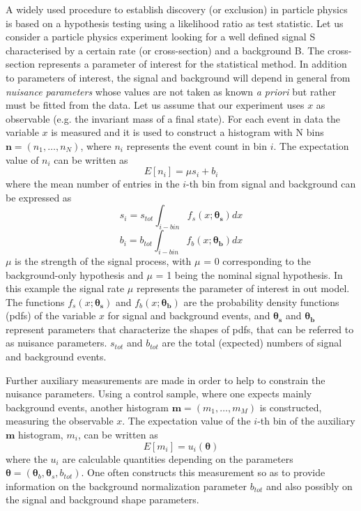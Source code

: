 \documentclass[a4paper, oneside, 11pt, openright]{book}
\begin{document}
 			A widely used procedure to establish discovery (or exclusion) in particle physics is based on a hypothesis testing using a likelihood ratio as test statistic. Let us consider a particle physics experiment looking for a well defined signal S characterised by a certain rate (or cross-section) and a background B. The cross-section represents a parameter of interest for the statistical method. In addition to parameters of interest, the signal and background will depend in general from \textit{nuisance parameters} whose values are not taken as known \textit{a priori} but rather must be fitted from the data. Let us assume that our experiment uses $x$ as observable (e.g. the invariant mass of a final state). For each event in data the variable $x$ is measured and it is used to construct a histogram with N bins $\textbf{n} = (n_1,\dots, n_N)$, where $n_i$ represents the event count in bin $i$. The expectation value of $n_i$ can be written as
 			\begin{equation}
 				E[n_i] = \mu s_i + b_i
 			\end{equation}
 			where the mean number of entries in the $i$-th bin from signal and background can be expressed as
 			\begin{equation}
 				s_i = s_{tot} \int_{i-bin} f_s(x;\boldsymbol{\theta_s}) dx
 			\end{equation}
 			\begin{equation}
 				b_i = b_{tot} \int_{i-bin} f_b(x;\boldsymbol{\theta_b}) dx
 			\end{equation}
 			$\mu$ is the strength of the signal process, with $\mu$ = 0 corresponding to the background-only hypothesis and $\mu$ = 1 being the nominal signal hypothesis. In this example the signal rate $\mu$ represents the parameter of interest in out model. The functions $f_s(x;\boldsymbol{\theta_s})$ and $f_b(x;\boldsymbol{\theta_b})$ are the probability density functions (pdfs) of the variable $x$ for signal and background events, and $\boldsymbol{\theta_s}$ and $\boldsymbol{\theta_b}$ represent parameters that characterize the shapes of pdfs, that can be referred to as nuisance parameters. $s_{tot}$ and $b_{tot}$ are the total (expected) numbers of signal and background events. %
 			
 			Further auxiliary measurements are made in order to help to constrain the nuisance parameters. Using a control sample, where one expects mainly background events, another histogram $\textbf{m} = (m_1,\dots,m_M)$ is constructed, measuring the observable $x$. The expectation value of the $i$-th bin of the auxiliary $\textbf{m}$ histogram, $m_i$, can be written as
 			\begin{equation}
 				E[m_i] = u_i(\boldsymbol{\theta})  
 			\end{equation}
 			where the $u_i$ are calculable quantities depending on the parameters $\boldsymbol{\theta} = (\boldsymbol{\theta}_b,\boldsymbol{\theta}_s,b_{tot})$. One often constructs this measurement so as to provide information on the background normalization parameter $b_{tot}$ and also possibly on the signal and background shape parameters.
 			
\end{document}
